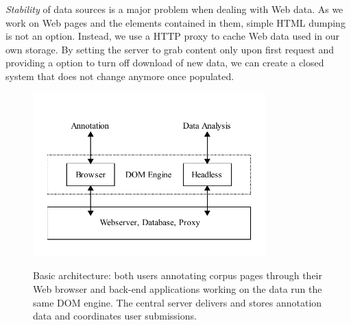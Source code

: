 \textit{Stability} of data sources is a major problem when dealing with Web data.
As we work on Web pages and the elements contained in them, simple HTML dumping is not an option.
Instead, we use a HTTP proxy to cache Web data used in our own storage.
By setting the server to grab content only upon first request and providing a option to turn off download of new data, we can create a closed system that does not change anymore once populated.


\begin{figure}
	{\includegraphics[width=0.8\textwidth]{arch}}
\caption{\label{f:arch}Basic {\KrdWrd} architecture: both users annotating corpus pages through their Web browser
and back-end applications working on the data run the same DOM engine.
	The central server delivers and stores annotation data and coordinates user submissions.}
\end{figure}



